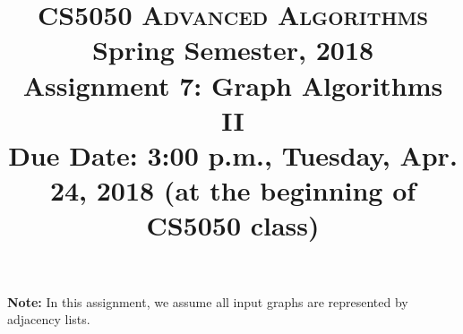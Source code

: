 \documentclass[11pt]{article}
\begin{document}
\baselineskip=14.0pt

\title{CS5050 \textsc{Advanced Algorithms}
\\{\Large Spring Semester, 2018}
\\ Assignment 7: Graph Algorithms II
\\ {\large {\bf Due Date: 3:00 p.m.}, Tuesday, Apr. 24, 2018 ({\bf at the beginning of CS5050 class})}}
\date{}


\maketitle

\vspace{-0.6in}

{\bf Note:} In this assignment, we assume all input graphs are represented by adjacency lists.
\end{document}
